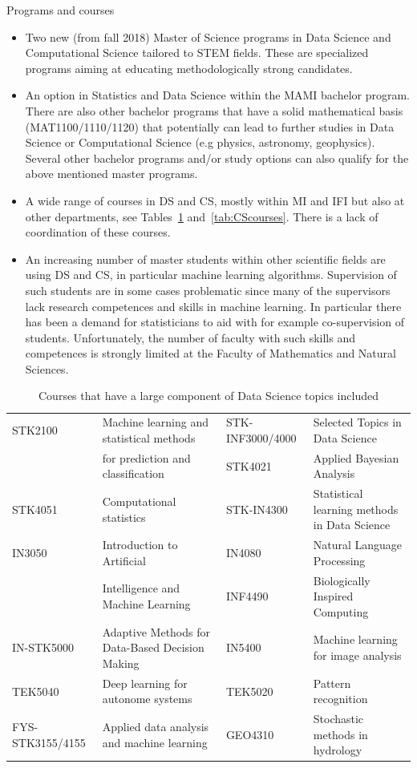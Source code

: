 \documentclass[a4paper,10pt]{article}
\begin{document}
Programs and courses
\begin{itemize}
\item Two new (from fall 2018) Master of Science programs in Data Science and Computational Science tailored to STEM fields. These are specialized programs aiming at educating methodologically strong candidates.
\item An option in Statistics and Data Science within the MAMI bachelor program. There are also other bachelor programs that have a solid mathematical basis (MAT1100/1110/1120) that potentially can lead to further studies in Data Science or Computational Science (e.g physics, astronomy, geophysics). 
Several other  bachelor programs and/or study options can also qualify for the above mentioned master programs.
\item A wide range of courses in DS and CS, mostly within MI and IFI but also at other departments, see Tables~\ref{tab:DScourses} and~\ref{tab:CScourses}.
There is a lack of coordination of these courses.
\item An increasing number of master students within other scientific fields are using DS and CS, in particular machine learning algorithms. Supervision of such students are in some cases problematic since many of the supervisors lack research competences and skills in machine learning. In particular there has been a demand for statisticians to aid with for example co-supervision of students. Unfortunately, the number of faculty with such skills and competences is strongly limited at the Faculty of Mathematics and Natural Sciences.
\end{itemize}
\begin{table}[t]
    \centering
    \tiny
    \begin{tabular}{llll}
    \hline
STK2100 & Machine learning and statistical methods&
STK-INF3000/4000 & Selected Topics in Data Science\\
&for prediction and classification&STK4021 &Applied Bayesian Analysis\\
STK4051 & Computational statistics&
STK-IN4300 & Statistical learning methods in Data Science\\
IN3050 & Introduction to Artificial&
IN4080 & Natural Language Processing\\
& Intelligence and Machine Learning&INF4490 & Biologically Inspired Computing\\
IN-STK5000 & Adaptive Methods for Data-Based Decision Making&
IN5400 & Machine learning for image analysis\\
TEK5040 & Deep learning for autonome systems&
TEK5020 & Pattern recognition\\
FYS-STK3155/4155 & Applied data analysis and machine learning&
GEO4310 &Stochastic methods in hydrology\\
\hline
\end{tabular}
\caption{Courses that have a large component of Data Science topics included}
\label{tab:DScourses}
\end{table}
\end{document}
